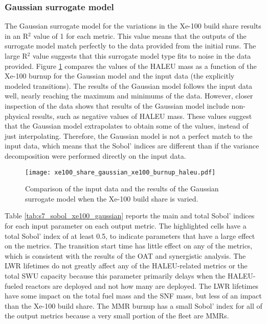 \subsubsection{Gaussian surrogate model}
The Gaussian surrogate model for the variations in the Xe-100 build 
share results in an R$^2$ value of 1 for each metric. This value 
means that the outputs of 
the surrogate model match perfectly to the data provided from the initial 
\Cyclus runs. The large R$^2$ value suggests that this surrogate model type 
fits to noise in the data provided. 
Figure \ref{fig:s7_xe100_gaussian} compares the values of the
\gls{HALEU} mass as a function of the Xe-100 burnup for the Gaussian model 
and the input data (the explicitly modeled transitions). The results of 
the Gaussian model follows the input 
data well, nearly reaching the maximum and minimums of the data. However, 
closer inspection of the data shows that results of the Gaussian model 
include non-physical results, such as negative values of \gls{HALEU} mass. 
These values suggest that the Gaussian model extrapolates to obtain 
some of the values, instead 
of just interpolating. Therefore, the Gaussian model is not a perfect 
match to the input data, which means that the Sobol' indices are different 
than if the variance decomposition were performed directly on the input 
data. 

\begin{figure}[h!]
    \centering 
    \texttt{[image: xe100\_share\_gaussian\_xe100\_burnup\_haleu.pdf]}
    \caption{Comparison of the input data and the results of the Gaussian 
    surrogate model when the Xe-100 build share is varied.}
    \label{fig:s7_xe100_gaussian}
\end{figure}

Table \ref{tab:s7_sobol_xe100_gaussian} reports the main and total Sobol' indices 
for each input parameter on each output metric. The highlighted cells have 
a total Sobol' index of at least 0.5, to indicate parameters that have a large 
effect on the metrics. 
The transition start time 
has little effect on any of the metrics, which is consistent with the 
results of the \gls{OAT} and synergistic analysis. The \gls{LWR} lifetimes 
do not greatly affect any of the \gls{HALEU}-related metrics or the 
total \gls{SWU} capacity because this parameter primarily delays when 
the \gls{HALEU}-fueled reactors are deployed and not how many are deployed. 
The \gls{LWR} lifetimes have some impact on the total 
fuel mass and the \gls{SNF} mass, but less of an impact than the Xe-100 
build share. 
The \gls{MMR} burnup has a small Sobol' index for all of the output metrics
because a very small portion of the fleet are \glspl{MMR}. 

